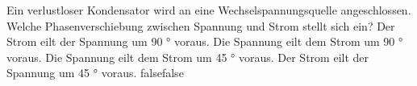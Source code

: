     {Ein verlustloser Kondensator wird an eine Wechselspannungsquelle angeschlossen. Welche Phasenverschiebung zwischen Spannung und Strom stellt sich ein?}
    {Der Strom eilt der Spannung um 90 ° voraus.}
    {Die Spannung eilt dem Strom um 90 ° voraus.}
    {Die Spannung eilt dem Strom um 45 ° voraus.}
    {Der Strom eilt der Spannung um 45 ° voraus.}
    {false}{false}